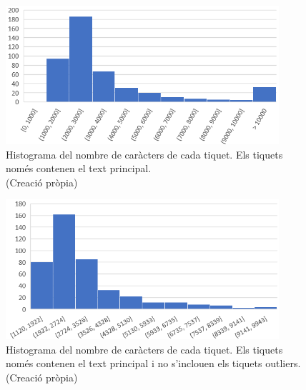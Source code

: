 \begin{figure}[H]
    \centering
    \includegraphics[width=0.9\textwidth]{histograma_num_chars_tiquets.png}
    \caption[Histograma dels caràcters del text principal de cada tiquet]{Histograma del nombre de caràcters de cada tiquet. Els tiquets només contenen el text principal. \\ (Creació pròpia)}
    \label{fig:histograma_num_chars_tiquets}
\end{figure}


\begin{figure}[H]
    \centering
    \includegraphics[width=0.9\textwidth]{histograma_num_chars_tiquets_outliers.png}
    \caption[Histograma dels caràcters del text principal de cada tiquet sense outliers]{Histograma del nombre de caràcters de cada tiquet. Els tiquets només contenen el text principal i no s'inclouen els tiquets outliers. \\ (Creació pròpia)}
    \label{fig:histograma_num_chars_tiquets_outliers}
\end{figure}

